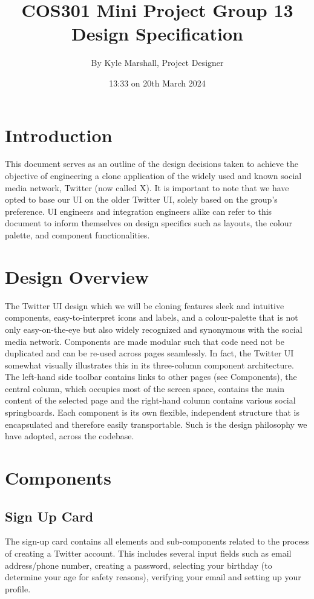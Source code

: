 \documentclass{article}
\title{COS301 Mini Project Group 13 Design Specification}
\author{By Kyle Marshall, Project Designer}
\date{13:33 on 20th March 2024}
\begin{document}
\maketitle

\section{Introduction}
This document serves as an outline of the design decisions taken to achieve the objective of engineering a clone application of the widely used and known social media network, Twitter (now called X). It is important to note that we have opted to base our UI on the older Twitter UI, solely based on the group’s preference. UI engineers and integration engineers alike can refer to this document to inform themselves on design specifics such as layouts, the colour palette, and component functionalities. 

\section{Design Overview}
The Twitter UI design which we will be cloning features sleek and intuitive components, easy-to-interpret icons and labels, and a colour-palette that is not only easy-on-the-eye but also widely recognized and synonymous with the social media network. Components are made modular such that code need not be duplicated and can be re-used across pages seamlessly. In fact, the Twitter UI somewhat visually illustrates this in its three-column component architecture. The left-hand side toolbar contains links to other pages (see Components), the central column, which occupies most of the screen space, contains the main content of the selected page and the right-hand column contains various social springboards. Each component is its own flexible, independent structure that is encapsulated and therefore easily transportable. Such is the design philosophy we have adopted, across the codebase. 

\section{Components}
\subsection{Sign Up Card}
The sign-up card contains all elements and sub-components related to the process of creating a Twitter account. This includes several input fields such as email address/phone number, creating a password, selecting your birthday (to determine your age for safety reasons), verifying your email and setting up your profile.
\end{document}
